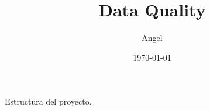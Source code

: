 \documentclass{article}
\title{Data Quality}
\author{Angel}
\date{\today}
\begin{document}
\maketitle

Estructura del proyecto.
\end{document}
